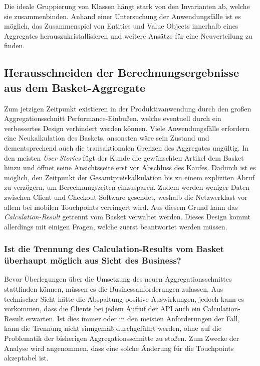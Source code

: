 Die ideale Gruppierung von Klassen hängt stark von den Invarianten ab, welche sie zusammenbinden. Anhand einer Untersuchung der Anwendungsfälle ist es möglich, das Zusammenspiel von Entities und Value Objects innerhalb eines Aggregates herauszukristallisieren und weitere Ansätze für eine Neuverteilung zu finden.

\subsection{Herausschneiden der Berechnungsergebnisse aus dem Basket-Aggregate}

Zum jetzigen Zeitpunkt existieren in der Produktivanwendung durch den großen Aggregationsschnitt Performance-Einbußen, welche eventuell durch ein verbessertes Design verhindert werden können. Viele Anwendungsfälle erfordern eine Neukalkulation des Baskets, ansonsten wäre sein Zustand und dementsprechend auch die transaktionalen Grenzen des Aggregates ungültig. In den meisten \emph{User Stories} fügt der Kunde die gewünschten Artikel dem Basket hinzu und öffnet seine Ansichtsseite erst vor Abschluss des Kaufes. Dadurch ist es möglich, den Zeitpunkt der Gesamtpreiskalkulation bis zu einem expliziten Abruf zu verzögern, um Berechnungszeiten einzusparen. Zudem werden weniger Daten zwischen Client und Checkout-Software gesendet, weshalb die Netzwerklast vor allem bei mobilen Touchpoints verringert wird. Aus diesem Grund kann das \emph{Calculation-Result} getrennt vom Basket verwaltet werden. Dieses Design kommt allerdings mit einigen Fragen, welche zuerst beantwortet werden müssen.

\subsubsection{Ist die Trennung des Calculation-Results vom Basket überhaupt möglich aus Sicht des Business?}

Bevor Überlegungen über die Umsetzung des neuen Aggregationsschnittes stattfinden können, müssen es die Businessanforderungen zulassen. Aus technischer Sicht hätte die Abspaltung positive Auswirkungen, jedoch kann es vorkommen, dass die Clients bei jedem Aufruf der API auch ein Calculation-Result erwarten. Ist dies immer oder in den meisten Anforderungen der Fall, kann die Trennung nicht sinngemäß durchgeführt werden, ohne auf die Problematik der bisherigen Aggregationsschnitte zu stoßen. Zum Zwecke der Analyse wird angenommen, dass eine solche Änderung für die Touchpoints akzeptabel ist.

